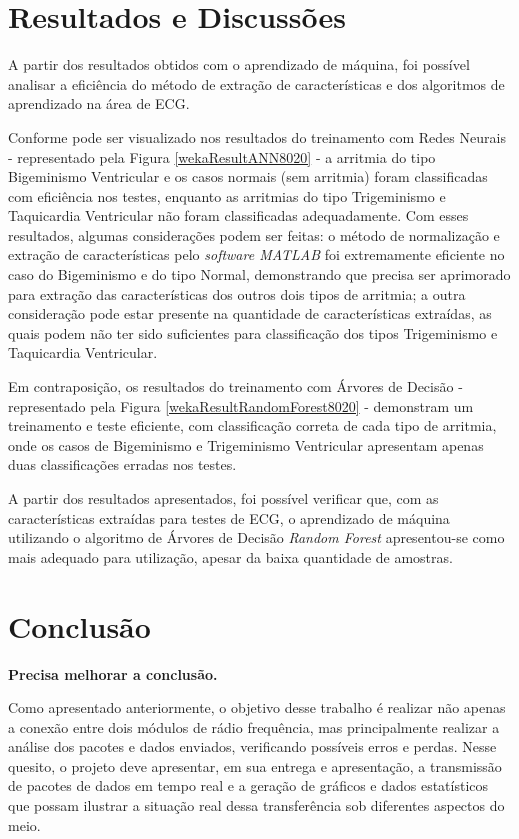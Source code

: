 \documentclass[conference]{IEEEtran}
\begin{document}
\section{Resultados e Discussões}

A partir dos resultados obtidos com o aprendizado de máquina, foi possível analisar a eficiência do método de extração de características e dos algoritmos de aprendizado na área de ECG.

Conforme pode ser visualizado nos resultados do treinamento com Redes Neurais - representado pela Figura \ref{wekaResultANN8020} - a arritmia do tipo Bigeminismo Ventricular e os casos normais (sem arritmia) foram classificadas com eficiência nos testes, enquanto as arritmias do tipo Trigeminismo e Taquicardia Ventricular não foram classificadas adequadamente. Com esses resultados, algumas considerações podem ser feitas: o método de normalização e extração de características pelo \textit{software MATLAB} foi extremamente eficiente no caso do Bigeminismo e do tipo Normal, demonstrando que precisa ser aprimorado para extração das características dos outros dois tipos de arritmia; a outra consideração pode estar presente na quantidade de características extraídas, as quais podem não ter sido suficientes para classificação dos tipos Trigeminismo e Taquicardia Ventricular.

Em contraposição, os resultados do treinamento com Árvores de Decisão - representado pela Figura \ref{wekaResultRandomForest8020} - demonstram um treinamento e teste eficiente, com classificação correta de cada tipo de arritmia, onde os casos de Bigeminismo e Trigeminismo Ventricular apresentam apenas duas classificações erradas nos testes.

A partir dos resultados apresentados, foi possível verificar que, com as características extraídas para testes de ECG, o aprendizado de máquina utilizando o algoritmo de Árvores de Decisão \textit{Random Forest} apresentou-se como mais adequado para utilização, apesar da baixa quantidade de amostras.

\section{Conclus\~ao}

\textbf{Precisa melhorar a conclusão.}

Como apresentado anteriormente, o objetivo desse trabalho \'e realizar n\~ao apenas a conex\~ao entre dois m\'odulos de r\'adio frequ\^encia, mas principalmente realizar a an\'alise dos pacotes e dados enviados, verificando poss\'iveis erros e perdas. Nesse quesito, o projeto deve apresentar, em sua entrega e apresenta\c{c}\~ao, a transmiss\~ao de pacotes de dados em tempo real e a gera\c{c}\~ao de gr\'aficos e dados estat\'isticos que possam ilustrar a situa\c{c}\~ao real dessa transfer\^encia sob diferentes aspectos do meio.
\end{document}
